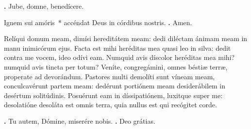 \begin{small}
\textbf{\Vbar.} Jube, domne, benedícere.

Ignem sui amóris~* accéndat Deus in córdibus nostris. \textbf{\Rbar.} Amen.
\end{small}


Relíqui domum meam, dimísi hereditátem meam: dedi diléctam ánimam meam in manu inimicórum ejus.
Facta est mihi heréditas mea quasi leo in silva: dedit contra me vocem, ideo odívi eam.
Numquid avis díscolor heréditas mea mihi? numquid avis tincta per totum? Veníte, congregámini, omnes béstiæ terræ, properate ad devorándum.
Pastores multi demolíti sunt víneam meam, conculcavérunt partem meam: dedérunt portiónem meam desiderábilem in desértum solitúdinis.
Posuérunt eam in díssipatiónem, luxitque super me: desolatióne desoláta est omnis terra, quia nullus est qui recógitet corde.

\textbf{\Vbar.} Tu autem, Dómine, miserére nobis.
\textbf{\Rbar.} Deo grátias.

